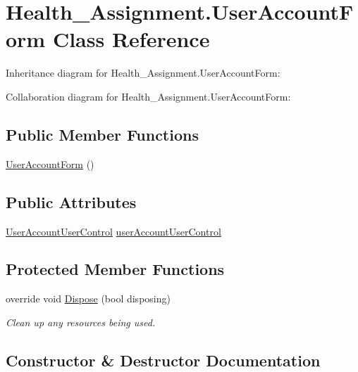 \hypertarget{class_health___assignment_1_1_user_account_form}{}\section{Health\+\_\+\+Assignment.\+User\+Account\+Form Class Reference}
\label{class_health___assignment_1_1_user_account_form}


Inheritance diagram for Health\+\_\+\+Assignment.\+User\+Account\+Form\+:


Collaboration diagram for Health\+\_\+\+Assignment.\+User\+Account\+Form\+:
\subsection*{Public Member Functions}
\begin{DoxyCompactItemize}
\item 
\hyperlink{class_health___assignment_1_1_user_account_form_a8ae1d0ec75a0bd62a46e338e7ff7f02f}{User\+Account\+Form} ()
\end{DoxyCompactItemize}
\subsection*{Public Attributes}
\begin{DoxyCompactItemize}
\item 
\hyperlink{class_health___assignment_1_1_user_account_user_control}{User\+Account\+User\+Control} \hyperlink{class_health___assignment_1_1_user_account_form_a24024db207f2fd59f3d61c4b0bf12e23}{user\+Account\+User\+Control}
\end{DoxyCompactItemize}
\subsection*{Protected Member Functions}
\begin{DoxyCompactItemize}
\item 
override void \hyperlink{class_health___assignment_1_1_user_account_form_aef77b731c2c91deb45e2b43c543094d9}{Dispose} (bool disposing)
\begin{DoxyCompactList}\small\item\em Clean up any resources being used. \end{DoxyCompactList}\end{DoxyCompactItemize}


\subsection{Constructor \& Destructor Documentation}
\mbox{\label{class_health___assignment_1_1_user_account_form_a8ae1d0ec75a0bd62a46e338e7ff7f02f}} 
